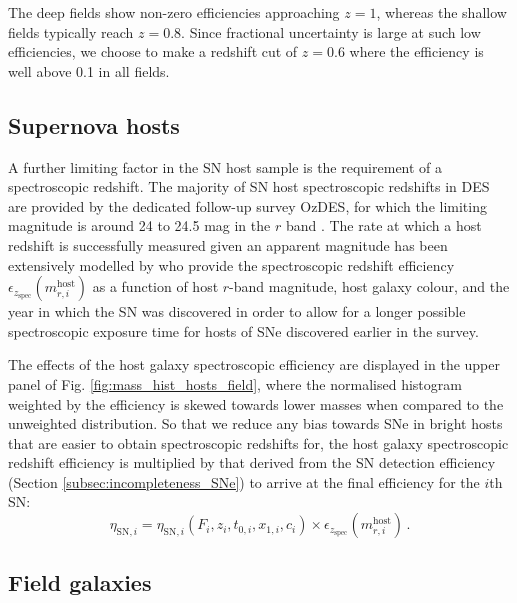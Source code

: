 \documentclass[fleqn,usenatbib]{mnras}
\begin{document}
The deep fields show non-zero efficiencies approaching $z=1$, whereas the shallow fields typically reach $z=0.8$. Since fractional uncertainty is large at such low efficiencies, we choose to make a redshift cut of $z=0.6$ where the efficiency is well above 0.1 in all fields. 

\subsection{Supernova hosts \label{subsec:incompletenss_SN_hosts}}
A further limiting factor in the SN host sample is the requirement of a spectroscopic redshift. The majority of SN host spectroscopic redshifts in DES are provided by the dedicated follow-up survey OzDES, for which the limiting magnitude is around 24 to 24.5 mag in the $r$ band \citep{Lidman2020}. The rate at which a host redshift is successfully measured given an apparent magnitude has been extensively modelled by \citet{Vincenzi2020} who provide the spectroscopic redshift efficiency $\epsilon_{z_{\mathrm{spec}}} (m^{\mathrm{host}}_{r,i})$ as a function of host $r$-band magnitude, host galaxy colour, and the year in which the SN was discovered in order to allow for a longer possible spectroscopic exposure time for hosts of SNe discovered earlier in the survey.

The effects of the host galaxy spectroscopic efficiency are displayed in the upper panel of Fig. \ref{fig:mass_hist_hosts_field}, where the normalised histogram weighted by the efficiency is skewed towards lower masses when compared to the unweighted distribution. So that we reduce any bias towards SNe in bright hosts that are easier to obtain spectroscopic redshifts for, the host galaxy spectroscopic redshift efficiency is multiplied by that derived from the SN detection efficiency (Section \ref{subsec:incompleteness_SNe}) to arrive at the final efficiency for the $i$th SN:
\begin{equation}
    \eta_{\mathrm{SN},i} = \eta_{\mathrm{SN},i} (F_i,z_i,t_{0,i},x_{1,i},c_i)\times \epsilon_{z_{\mathrm{spec}}} (m^{\mathrm{host}}_{r,i})\,.
\end{equation}

\subsection{Field galaxies \label{subsec:incompleteness_field}}
\end{document}
